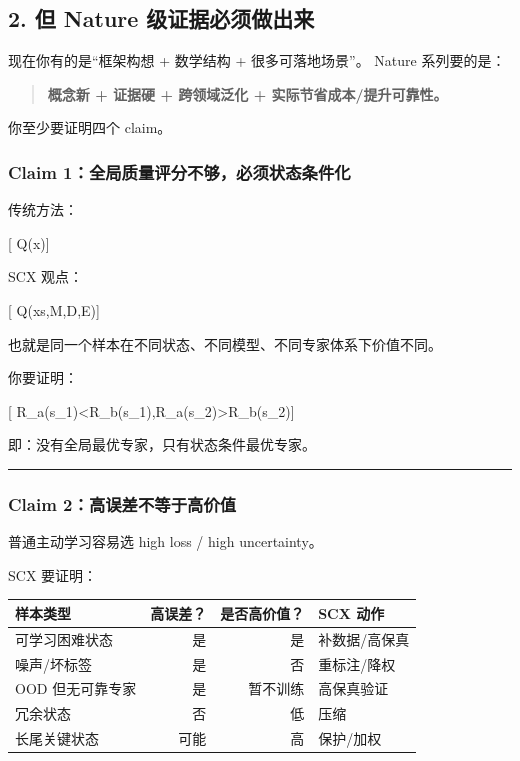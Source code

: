 \documentclass[
  12pt,
]{ctexart}
\begin{document}
\subsection{2. 但 Nature
级证据必须做出来}\label{ux4f46-nature-ux7ea7ux8bc1ux636eux5fc5ux987bux505aux51faux6765}

现在你有的是``框架构想 + 数学结构 + 很多可落地场景''。 Nature
系列要的是：

\begin{quote}
\textbf{概念新 + 证据硬 + 跨领域泛化 + 实际节省成本/提升可靠性。}
\end{quote}

你至少要证明四个 claim。

\subsubsection{Claim
1：全局质量评分不够，必须状态条件化}\label{claim-1ux5168ux5c40ux8d28ux91cfux8bc4ux5206ux4e0dux591fux5fc5ux987bux72b6ux6001ux6761ux4ef6ux5316}

传统方法：

{[} Q(x){]}

SCX 观点：

{[} Q(x\mid s,\mathcal M,\mathcal D,\mathcal E){]}

也就是同一个样本在不同状态、不同模型、不同专家体系下价值不同。

你要证明：

{[}
R\_a(s\_1)\textless R\_b(s\_1),\quad R\_a(s\_2)\textgreater R\_b(s\_2){]}

即：没有全局最优专家，只有状态条件最优专家。

\begin{center}\rule{0.5\linewidth}{0.5pt}\end{center}

\subsubsection{Claim
2：高误差不等于高价值}\label{claim-2ux9ad8ux8befux5deeux4e0dux7b49ux4e8eux9ad8ux4ef7ux503c}

普通主动学习容易选 high loss / high uncertainty。

SCX 要证明：

\begin{longtable}[]{@{}lrrl@{}}
\toprule\noalign{}
样本类型 & 高误差？ & 是否高价值？ & SCX 动作 \\
\midrule\noalign{}
\endhead
\bottomrule\noalign{}
\endlastfoot
可学习困难状态 & 是 & 是 & 补数据/高保真 \\
噪声/坏标签 & 是 & 否 & 重标注/降权 \\
OOD 但无可靠专家 & 是 & 暂不训练 & 高保真验证 \\
冗余状态 & 否 & 低 & 压缩 \\
长尾关键状态 & 可能 & 高 & 保护/加权 \\
\end{longtable}
\end{document}
